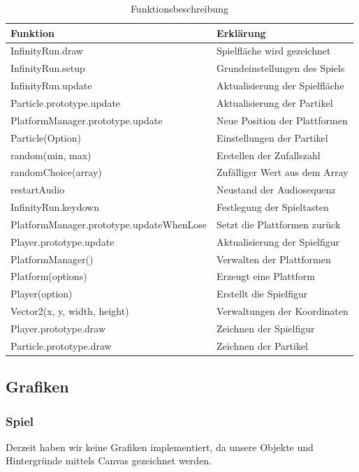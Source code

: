 \begin{table}[h]
	\begin{tabular}{|l|l|}
		\toprule
		\textbf{Funktion}& \textbf{Erklärung}\\
		\midrule
		InfinityRun.draw & Spielfläche wird gezeichnet	\\ 
		InfinityRun.setup & Grundeinstellungen des Spiels	\\
		InfinityRun.update & Aktualisierung der Spielfläche	\\ 
		Particle.prototype.update & Aktualisierung der Partikel	\\ 
		PlatformManager.prototype.update & Neue Position der Plattformen	\\ 
		Particle(Option) & Einstellungen der Partikel	\\ 
		random(min, max) & Erstellen der Zufallszahl\\
		randomChoice(array) & Zufälliger Wert aus dem Array	\\
		restartAudio & Neustand der Audiosequenz	\\
		InfinityRun.keydown & Festlegung der Spieltasten	\\
		PlatformManager.prototype.updateWhenLose & Setzt die Plattformen zurück	\\
		Player.prototype.update & Aktualisierung der Spielfigur	\\
		PlatformManager() & Verwalten der Plattformen	\\
		Platform(options) & Erzeugt eine Plattform	\\
		Player(option) & Erstellt die Spielfigur	\\
		Vector2(x, y, width, height) & Verwaltungen der Koordinaten	\\
		Player.prototype.draw & Zeichnen der Spielfigur	\\
		Particle.prototype.draw & Zeichnen der Partikel	\\
		\bottomrule
	\end{tabular}
	\caption{Funktionsbeschreibung}
\end{table}
\subsection{Grafiken}
\subsubsection{Spiel}
Derzeit haben wir keine Grafiken implementiert, da unsere Objekte und Hintergründe mittels Canvas gezeichnet werden.
